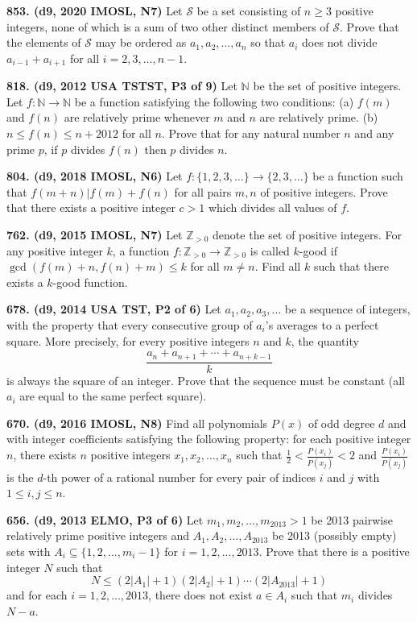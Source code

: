 \documentclass{article}
\begin{document}
\textbf{853. (\color{red}d9\color{black}, 2020 IMOSL, N7)} Let $\mathcal{S}$ be a set consisting of $n \ge 3$ positive integers, none of which is a sum of two other distinct members of $\mathcal{S}$. Prove that the elements of $\mathcal{S}$ may be ordered as $a_1, a_2, \dots, a_n$ so that $a_i$ does not divide $a_{i - 1} + a_{i + 1}$ for all $i = 2, 3, \dots, n - 1$.

\textbf{818. (\color{red}d9\color{black}, 2012 USA TSTST, P3 of 9)} Let $\mathbb N$ be the set of positive integers. Let $f: \mathbb N \to \mathbb N$ be a function satisfying the following two conditions:
\smallbreak
(a) $f(m)$ and $f(n)$ are relatively prime whenever $m$ and $n$ are relatively prime.
\smallbreak
(b) $n \le f(n) \le n+2012$ for all $n$.
\bigbreak
Prove that for any natural number $n$ and any prime $p$, if $p$ divides $f(n)$ then $p$ divides $n$.

\textbf{804. (\color{red}d9\color{black}, 2018 IMOSL, N6)} Let $f : \{ 1, 2, 3, \dots \} \to \{ 2, 3, \dots \}$ be a function such that $f(m + n) | f(m) + f(n) $ for all pairs $m,n$ of positive integers. Prove that there exists a positive integer $c > 1$ which divides all values of $f$.

\textbf{762. (\color{red}d9\color{black}, 2015 IMOSL, N7)} Let $\mathbb{Z}_{>0}$ denote the set of positive integers. For any positive integer $k$, a function $f: \mathbb{Z}_{>0} \to \mathbb{Z}_{>0}$ is called $k$-good if $\gcd(f(m) + n, f(n) + m) \le k$ for all $m \neq n$. Find all $k$ such that there exists a $k$-good function.

\textbf{678. (\color{red}d9\color{black}, 2014 USA TST, P2 of 6)} Let $a_1,a_2,a_3,\ldots$ be a sequence of integers, with the property that every consecutive group of $a_i$'s averages to a perfect square. More precisely, for every positive integers $n$ and $k$, the quantity\[\frac{a_n+a_{n+1}+\cdots+a_{n+k-1}}{k}\]is always the square of an integer. Prove that the sequence must be constant (all $a_i$ are equal to the same perfect square).

\textbf{670. (\color{red}d9\color{black}, 2016 IMOSL, N8)} Find all polynomials $P(x)$ of odd degree $d$ and with integer coefficients satisfying the following property: for each positive integer $n$, there exists $n$ positive integers $x_1, x_2, \ldots, x_n$ such that $\frac12 < \frac{P(x_i)}{P(x_j)} < 2$ and $\frac{P(x_i)}{P(x_j)}$ is the $d$-th power of a rational number for every pair of indices $i$ and $j$ with $1 \leq i, j \leq n$.

\textbf{656. (\color{red}d9\color{black}, 2013 ELMO, P3 of 6)} Let $m_1,m_2,...,m_{2013} > 1$ be 2013 pairwise relatively prime positive integers and $A_1,A_2,...,A_{2013}$ be 2013 (possibly empty) sets with $A_i\subseteq \{1,2,...,m_i-1\}$ for $i=1,2,...,2013$. Prove that there is a positive integer $N$ such that
\[ N \le \left( 2\left\lvert A_1 \right\rvert + 1 \right)\left( 2\left\lvert A_2 \right\rvert + 1 \right)\cdots\left( 2\left\lvert A_{2013} \right\rvert + 1 \right) \]
and for each $i = 1, 2, ..., 2013$, there does not exist $a \in A_i$ such that $m_i$ divides $N-a$.
\end{document}
